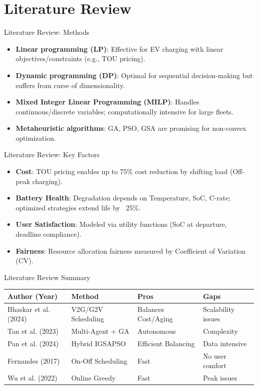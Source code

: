\documentclass{beamer}
\begin{document}
\section{Literature Review}
\begin{frame}{Literature Review: Methods}
  \begin{itemize}
    \item \textbf{Linear programming (LP)}: Effective for EV charging with linear objectives/constraints (e.g., TOU pricing).
    \item \textbf{Dynamic programming (DP)}: Optimal for sequential decision-making but suffers from curse of dimensionality.
    \item \textbf{Mixed Integer Linear Programming (MILP)}: Handles continuous/discrete variables; computationally intensive for large fleets.
    \item \textbf{Metaheuristic algorithms}: GA, PSO, GSA are promising for non-convex optimization.
  \end{itemize}
\end{frame}

\begin{frame}{Literature Review: Key Factors}
  \begin{itemize}
    \item \textbf{Cost}: TOU pricing enables up to 75\% cost reduction by shifting load (Off-peak charging).
    \item \textbf{Battery Health}: Degradation depends on Temperature, SoC, C-rate; optimized strategies extend life by ~25\%.
    \item \textbf{User Satisfaction}: Modeled via utility functions (SoC at departure, deadline compliance).
    \item \textbf{Fairness}: Resource allocation fairness measured by Coefficient of Variation (CV).
  \end{itemize}
\end{frame}

\begin{frame}{Literature Review Summary}
  \footnotesize
  \begin{tabular}{|p{2.5cm}|p{2.5cm}|p{2.5cm}|p{2.5cm}|}
    \hline
    \textbf{Author (Year)} & \textbf{Method} & \textbf{Pros} & \textbf{Gaps} \\
    \hline
    Bhaskar et al. (2024) & V2G/G2V Scheduling & Balances Cost/Aging & Scalability issues \\
    \hline
    Tan et al. (2023) & Multi-Agent + GA & Autonomous & Complexity \\
    \hline
    Pan et al. (2024) & Hybrid IGSAPSO & Efficient Balancing & Data intensive \\
    \hline
    Fernandes (2017) & On-Off Scheduling & Fast & No user comfort \\
    \hline
    Wu et al. (2022) & Online Greedy & Fast & Peak issues \\
    \hline
  \end{tabular}
\end{frame}
\end{document}

